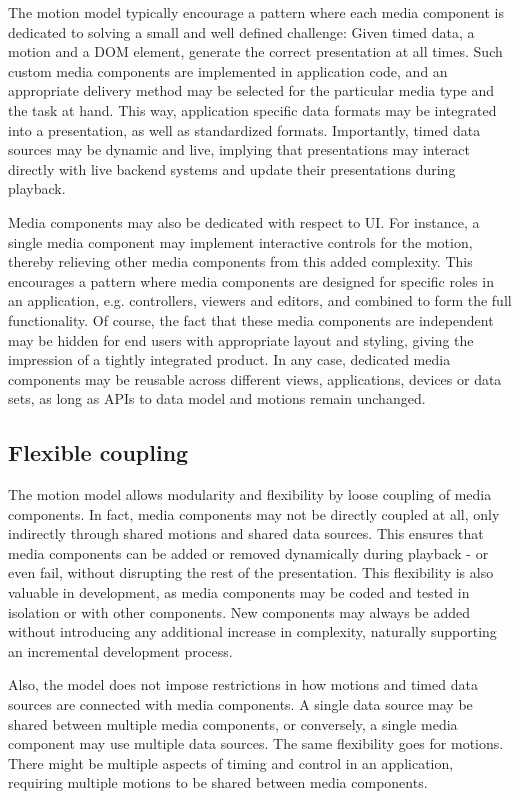 The motion model typically encourage a pattern where each media
component is dedicated to solving a small and well defined challenge: Given
timed data, a motion and a DOM element, generate the correct presentation at
all times. Such custom media components are implemented in application code,
and an appropriate delivery method may be selected for the particular media
type and the task at hand. This way, application specific data formats may be
integrated into a presentation, as well as standardized formats. Importantly,
timed data sources may be dynamic and live, implying that presentations may
interact directly with live backend systems and update their presentations
during playback.

Media components may also be dedicated with respect to UI. For instance, a
single media component may implement interactive controls for the motion,
thereby relieving other media components from this added complexity. This
encourages a pattern where media components are designed for specific roles in
an application, e.g. controllers, viewers and editors, and combined to form
the full functionality. Of course, the fact that these media components are
independent may be hidden for end users with appropriate layout and styling,
giving the impression of a tightly integrated product. In any case, dedicated
media components may be reusable across different views, applications, devices
or data sets, as long as APIs to data model and motions remain unchanged.

\subsection{Flexible coupling}

The motion model allows modularity and flexibility by loose
coupling of media components. In fact, media components may not be directly
coupled at all, only indirectly through shared motions and shared data
sources. This ensures that media components can be added or removed
dynamically during playback - or even fail, without disrupting the rest of the
presentation. This flexibility is also valuable in development, as media
components may be coded and tested in isolation or with other components. New
components may always be added without introducing any additional increase in
complexity, naturally supporting an incremental development process.

Also, the model does not impose restrictions in how motions
and timed data sources are connected with media components. A single data
source may be shared between multiple media components, or conversely, a
single media component may use multiple data sources. The same flexibility
goes for motions. There might be multiple aspects of timing and control in an
application, requiring multiple motions to be shared between media components.


